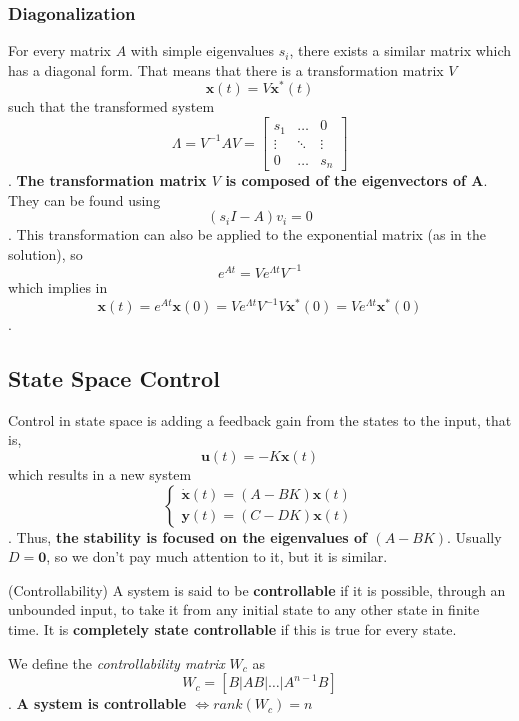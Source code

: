 \documentclass[a4paper]{report}
\begin{document}
\subsubsection*{Diagonalization}

For every matrix $A$ with simple eigenvalues $s_i$, there exists a similar matrix which has a diagonal form. That means that there is a transformation matrix $V$  \[
\bm{x}(t) = V\bm{x}^*(t)
\]  such that the transformed system \[
\Lambda = V^{-1}AV = \begin{bmatrix} s_1 & \ldots & 0 \\ \vdots & \ddots & \vdots \\ 0 & \ldots & s_n\end{bmatrix} 
\]. \textbf{The transformation matrix $V$ is composed of the eigenvectors of A}. They can be found using \[
(s_iI - A)v_i = 0
\]. This transformation can also be applied to the exponential matrix (as in the solution), so \[
e^{At} = Ve^{\Lambda t}V^{-1}
\] which implies in \[
\bm{x}(t) = e^{At}\bm{x}(0) = Ve^{\Lambda t}V^{-1}V\bm{x}^*(0) = Ve^{\Lambda t}\bm{x}^*(0)
\].

\subsection*{State Space Control}

Control in state space is adding a feedback gain from the states to the input, that is, \[
\bm{u}(t) = -K\bm{x}(t)
\] which results in a new system \[
\begin{cases}
    \bm{\dot{x}}(t) = \left( A-BK \right) \bm{x}(t) \\
    \bm{y}(t) = \left( C - DK \right) \bm{x}(t)
\end{cases}
\]. Thus, \textbf{the stability is focused on the eigenvalues of $\left( A-BK \right) $}. Usually $D=\bm{0}$, so we don't pay much attention to it, but it is similar.

\begin{definition}
    (Controllability) A system is said to be \textbf{controllable} if it is possible, through an unbounded input, to take it from any initial state to any other state in finite time. It is \textbf{completely state controllable} if this is true for every state.

    We define the \emph{controllability matrix} $W_c$ as \[
    W_c = \left[ B | AB | \ldots | A^{n-1}B \right] 
    \]. \textbf{A system is controllable $\iff rank\left( W_c \right) = n$}
\end{definition}
\end{document}
